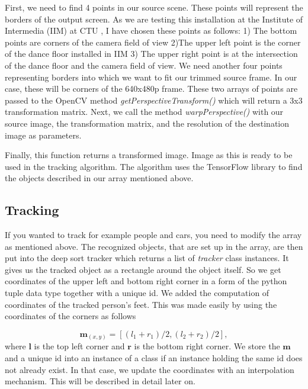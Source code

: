 \documentclass{ctuthesis}
\begin{document}
First, we need to find 4 points in our source scene. These points will represent the borders of the output screen. As we are testing this installation at the Institute of Intermedia (IIM) at CTU \cite{95}, I have chosen these points as follows: 1) The bottom points are corners of the camera field of view 2)The upper left point is the corner of the dance floor installed in IIM 3) The upper right point is at the intersection of the dance floor and the camera field of view. We need another four points representing borders into which we want to fit our trimmed source frame. In our case, these will be corners of the 640x480p frame. These two arrays of points are passed to the OpenCV method \textit{getPerspectiveTransform()} which will return a 3x3 transformation matrix. Next, we call the method \textit{warpPerspective()} with our source image, the transformation matrix, and the resolution of the destination image as parameters. 

Finally, this function returns a transformed image. Image as this is ready to be used in the tracking algorithm. The algorithm uses the TensorFlow library to find the objects described in our array mentioned above.

\subsection{Tracking} \label{tracking}
If you wanted to track for example people and cars, you need to modify the array as mentioned above. The recognized objects, that are set up in the array, are then put into the deep sort tracker which returns a list of \textit{tracker} class instances. It gives us the tracked object as a rectangle around the object itself. So we get coordinates of the upper left and bottom right corner in a form of the python tuple data type together with a unique id. We added the computation of coordinates of the tracked person's feet. This was made easily by using the coordinates of the corners as follows

\begin{equation}
\textbf{m}_{(x, y)} = [(l_1 + r_1)/2, (l_2 + r_2)/2],
\end{equation}
where \(\textbf{l}\) is the top left corner and \(\textbf{r}\) is the bottom right corner. We store the \(\textbf{m}\) and a unique id into an instance of a class if an instance holding the same id does not already exist. In that case, we update the coordinates with an interpolation mechanism. This will be described in detail later on.
\end{document}
